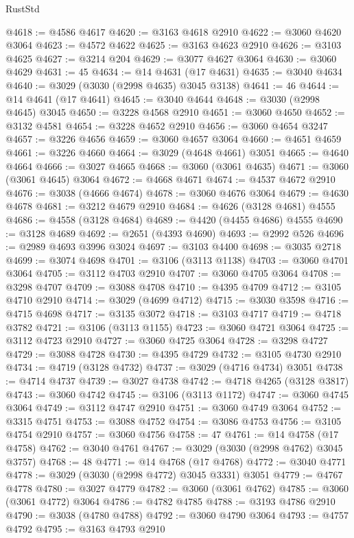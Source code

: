 \begin{lexlean}{RustStd}
\begin{coremodule}
@4618 := @4586 @4617
@4620 := @3163 @4618 @2910
@4622 := @3060 @4620 @3064
@4623 := @4572 @4622
@4625 := @3163 @4623 @2910
@4626 := @3103 @4625
@4627 := @3214 @204
@4629 := @3077 @4627 @3064
@4630 := @3060 @4629
@4631 := 45
@4634 := @14 @4631 (@17 @4631)
@4635 := @3040 @4634
@4640 := @3029 (@3030 (@2998 @4635) @3045 @3138)
@4641 := 46
@4644 := @14 @4641 (@17 @4641)
@4645 := @3040 @4644
@4648 := @3030 (@2998 @4645) @3045
@4650 := @3228 @4568 @2910
@4651 := @3060 @4650
@4652 := @3132 @4581
@4654 := @3228 @4652 @2910
@4656 := @3060 @4654 @3247
@4657 := @3226 @4656
@4659 := @3060 @4657 @3064
@4660 := @4651 @4659
@4661 := @3226 @4660
@4664 := @3029 (@4648 @4661) @3051
@4665 := @4640 @4664
@4666 := @3027 @4665
@4668 := @3060 (@3061 @4635)
@4671 := @3060 (@3061 @4645) @3064
@4672 := @4668 @4671
@4674 := @4537 @4672 @2910
@4676 := @3038 (@4666 @4674)
@4678 := @3060 @4676 @3064
@4679 := @4630 @4678
@4681 := @3212 @4679 @2910
@4684 := @4626 (@3128 @4681) @4555
@4686 := @4558 (@3128 @4684)
@4689 := @4420 (@4455 @4686) @4555
@4690 := @3128 @4689
@4692 := @2651 (@4393 @4690)
@4693 := @2992 @526
@4696 := @2989 @4693 @3996 @3024
@4697 := @3103 @4400
@4698 := @3035 @2718
@4699 := @3074 @4698
@4701 := @3106 (@3113 @1138)
@4703 := @3060 @4701 @3064
@4705 := @3112 @4703 @2910
@4707 := @3060 @4705 @3064
@4708 := @3298 @4707
@4709 := @3088 @4708
@4710 := @4395 @4709
@4712 := @3105 @4710 @2910
@4714 := @3029 (@4699 @4712)
@4715 := @3030 @3598
@4716 := @4715 @4698
@4717 := @3135 @3072
@4718 := @3103 @4717
@4719 := @4718 @3782
@4721 := @3106 (@3113 @1155)
@4723 := @3060 @4721 @3064
@4725 := @3112 @4723 @2910
@4727 := @3060 @4725 @3064
@4728 := @3298 @4727
@4729 := @3088 @4728
@4730 := @4395 @4729
@4732 := @3105 @4730 @2910
@4734 := @4719 (@3128 @4732)
@4737 := @3029 (@4716 @4734) @3051
@4738 := @4714 @4737
@4739 := @3027 @4738
@4742 := @4718 @4265 (@3128 @3817)
@4743 := @3060 @4742
@4745 := @3106 (@3113 @1172)
@4747 := @3060 @4745 @3064
@4749 := @3112 @4747 @2910
@4751 := @3060 @4749 @3064
@4752 := @3315 @4751
@4753 := @3088 @4752
@4754 := @3086 @4753
@4756 := @3105 @4754 @2910
@4757 := @3060 @4756
@4758 := 47
@4761 := @14 @4758 (@17 @4758)
@4762 := @3040 @4761
@4767 := @3029 (@3030 (@2998 @4762) @3045 @3757)
@4768 := 48
@4771 := @14 @4768 (@17 @4768)
@4772 := @3040 @4771
@4778 := @3029 (@3030 (@2998 @4772) @3045 @3331) @3051
@4779 := @4767 @4778
@4780 := @3027 @4779
@4782 := @3060 (@3061 @4762)
@4785 := @3060 (@3061 @4772) @3064
@4786 := @4782 @4785
@4788 := @3193 @4786 @2910
@4790 := @3038 (@4780 @4788)
@4792 := @3060 @4790 @3064
@4793 := @4757 @4792
@4795 := @3163 @4793 @2910

\end{coremodule}
\end{lexlean}
